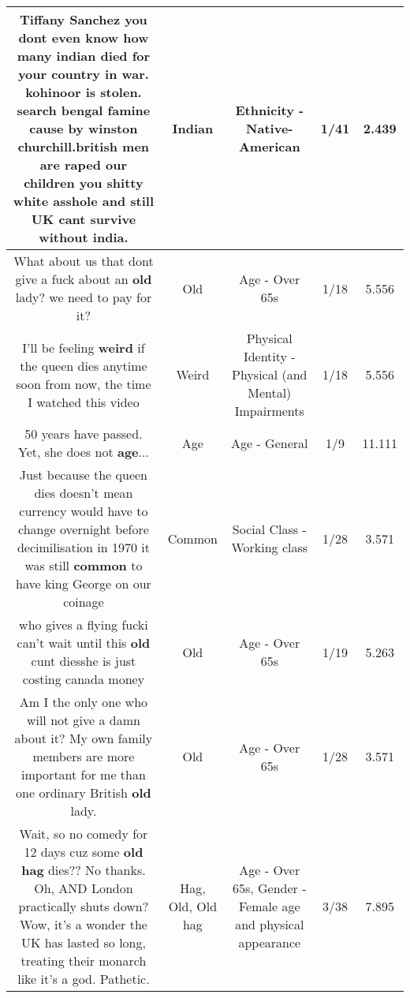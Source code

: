 \documentclass[11pt]{article}
\newlength\mylength
\begin{document}
\begin{center}
\begin{longtable}{|C{.65\mylength}|C{.30\mylength}|C{.12\mylength}|C{.12\mylength}|C{.12\mylength}|}
  \small Tiffany Sanchez you dont even know how many \textbf{indian} died for your country in war. kohinoor is stolen. search bengal famine cause by winston churchill.british men are raped our children you shitty white asshole and still UK cant survive without india.\normalsize   & Indian & Ethnicity - Native-American & 1/41 & 2.439 \\  \hline
  \small What about us that dont give a fuck about an \textbf{old} lady?  we need to pay for it?\normalsize   & Old & Age - Over 65s & 1/18 & 5.556 \\  \hline
  \small I'll be feeling \textbf{weird} if the queen dies anytime soon from now, the time I watched this video\normalsize   & Weird & Physical Identity - Physical (and Mental) Impairments & 1/18 & 5.556 \\  \hline
  \small 50 years have passed. Yet, she does not \textbf{age}...\normalsize   & Age & Age - General & 1/9 & 11.111 \\  \hline
  \small Just because the queen dies doesn't mean currency would have to change overnight before decimilisation in 1970 it was still \textbf{common} to have king George on our coinage\normalsize   & Common & Social Class - Working class & 1/28 & 3.571 \\  \hline
  \small who gives a flying fucki can't wait until this \textbf{old} cunt diesshe is just costing canada money\normalsize   & Old & Age - Over 65s & 1/19 & 5.263 \\  \hline
  \small Am I the only one who will not give a damn about it? My own family members are more important for me than one ordinary British \textbf{old} lady.\normalsize   & Old & Age - Over 65s & 1/28 & 3.571 \\  \hline
  \small Wait, so no comedy for 12 days cuz some \textbf{o\textbf{ld} h\textbf{ag}} dies?? No thanks. Oh, AND London practically shuts down? Wow, it's a wonder the UK has lasted so long, treating their monarch like it's a god. Pathetic.\normalsize   & Hag, Old, Old hag & Age - Over 65s, Gender - Female age and physical appearance & 3/38 & 7.895 \\  \hline

\end{longtable}
\end{center}
\end{document}
